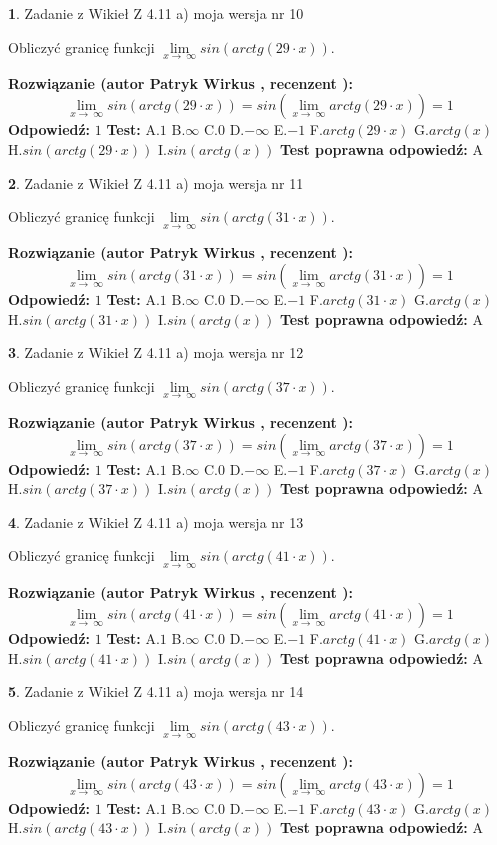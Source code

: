 \documentclass[12pt, a4paper]{article}
\theoremstyle{definition} %
\newtheorem{zad}{}
\newcommand{\zadStart}[1]{\begin{zad}#1\newline}
\newcommand{\zadStop}{\end{zad}}
\newcommand{\rozwStart}[2]{\noindent \textbf{Rozwiązanie (autor #1 , recenzent #2): }\newline}
\newcommand{\rozwStop}{\newline}
\newcommand{\odpStart}{\noindent \textbf{Odpowiedź:}\newline}
\newcommand{\odpStop}{\newline}
\newcommand{\testStart}{\noindent \textbf{Test:}\newline}
\newcommand{\testStop}{\newline}
\newcommand{\kluczStart}{\noindent \textbf{Test poprawna odpowiedź:}\newline}
\newcommand{\kluczStop}{\newline}
\begin{document}
\zadStart{Zadanie z Wikieł Z 4.11 a) moja wersja nr 10}

Obliczyć granicę funkcji  $\lim\limits_{x\to\ \infty}sin(arctg(29\cdot x))$.
\zadStop
\rozwStart{Patryk Wirkus}{}
$$\lim\limits_{x\to\ \infty}sin(arctg(29\cdot x)) = sin(\lim\limits_{x\to\ \infty}arctg(29\cdot x)) = 1$$
\rozwStop
\odpStart
$1$
\odpStop
\testStart
A.$1$ B.$\infty$ C.$0$ D.$-\infty$ E.$-1$
F.$arctg(29\cdot x)$ G.$arctg(x)$
H.$sin(arctg(29\cdot x))$
I.$sin(arctg(x))$
\testStop
\kluczStart
A
\kluczStop



\zadStart{Zadanie z Wikieł Z 4.11 a) moja wersja nr 11}

Obliczyć granicę funkcji  $\lim\limits_{x\to\ \infty}sin(arctg(31\cdot x))$.
\zadStop
\rozwStart{Patryk Wirkus}{}
$$\lim\limits_{x\to\ \infty}sin(arctg(31\cdot x)) = sin(\lim\limits_{x\to\ \infty}arctg(31\cdot x)) = 1$$
\rozwStop
\odpStart
$1$
\odpStop
\testStart
A.$1$ B.$\infty$ C.$0$ D.$-\infty$ E.$-1$
F.$arctg(31\cdot x)$ G.$arctg(x)$
H.$sin(arctg(31\cdot x))$
I.$sin(arctg(x))$
\testStop
\kluczStart
A
\kluczStop



\zadStart{Zadanie z Wikieł Z 4.11 a) moja wersja nr 12}

Obliczyć granicę funkcji  $\lim\limits_{x\to\ \infty}sin(arctg(37\cdot x))$.
\zadStop
\rozwStart{Patryk Wirkus}{}
$$\lim\limits_{x\to\ \infty}sin(arctg(37\cdot x)) = sin(\lim\limits_{x\to\ \infty}arctg(37\cdot x)) = 1$$
\rozwStop
\odpStart
$1$
\odpStop
\testStart
A.$1$ B.$\infty$ C.$0$ D.$-\infty$ E.$-1$
F.$arctg(37\cdot x)$ G.$arctg(x)$
H.$sin(arctg(37\cdot x))$
I.$sin(arctg(x))$
\testStop
\kluczStart
A
\kluczStop



\zadStart{Zadanie z Wikieł Z 4.11 a) moja wersja nr 13}

Obliczyć granicę funkcji  $\lim\limits_{x\to\ \infty}sin(arctg(41\cdot x))$.
\zadStop
\rozwStart{Patryk Wirkus}{}
$$\lim\limits_{x\to\ \infty}sin(arctg(41\cdot x)) = sin(\lim\limits_{x\to\ \infty}arctg(41\cdot x)) = 1$$
\rozwStop
\odpStart
$1$
\odpStop
\testStart
A.$1$ B.$\infty$ C.$0$ D.$-\infty$ E.$-1$
F.$arctg(41\cdot x)$ G.$arctg(x)$
H.$sin(arctg(41\cdot x))$
I.$sin(arctg(x))$
\testStop
\kluczStart
A
\kluczStop



\zadStart{Zadanie z Wikieł Z 4.11 a) moja wersja nr 14}

Obliczyć granicę funkcji  $\lim\limits_{x\to\ \infty}sin(arctg(43\cdot x))$.
\zadStop
\rozwStart{Patryk Wirkus}{}
$$\lim\limits_{x\to\ \infty}sin(arctg(43\cdot x)) = sin(\lim\limits_{x\to\ \infty}arctg(43\cdot x)) = 1$$
\rozwStop
\odpStart
$1$
\odpStop
\testStart
A.$1$ B.$\infty$ C.$0$ D.$-\infty$ E.$-1$
F.$arctg(43\cdot x)$ G.$arctg(x)$
H.$sin(arctg(43\cdot x))$
I.$sin(arctg(x))$
\testStop
\kluczStart
A
\kluczStop
\end{document}

